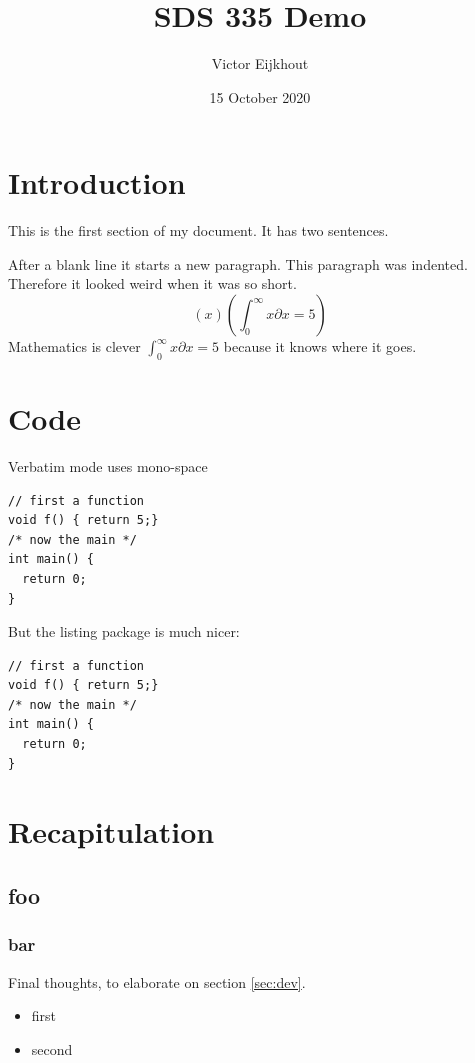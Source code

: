 \documentclass{article} %
\title{SDS 335 Demo}
\author{Victor Eijkhout }
\date{15 October 2020}
\begin{document}
\maketitle

\tableofcontents

\section{Introduction}

This is the first section of my document.
It has two sentences.

After a blank line
it
starts a new paragraph.
This paragraph was indented. Therefore it looked
weird when it was so short.
\[ \left( x \right ) \left( \int_0^\infty x\partial x= 5 \right) \]
Mathematics is clever $\int_0^\infty x\partial x= 5$
because it knows where it goes.

\section{Code}

Verbatim mode uses mono-space
\begin{verbatim}
// first a function
void f() { return 5;}
/* now the main */
int main() {
  return 0;
}
\end{verbatim}
But the listing package is much nicer:
\lstset{language=C,style=reviewcode}
\begin{lstlisting}
// first a function
void f() { return 5;}
/* now the main */
int main() {
  return 0;
}
\end{lstlisting}
\section{Recapitulation}
\label{sec:recap}
\subsection{foo}
\subsubsection{bar}

Final thoughts, to elaborate on section \ref{sec:dev}.
\begin{itemize}
    \item first
    \item second
\end{itemize}
\end{document}
